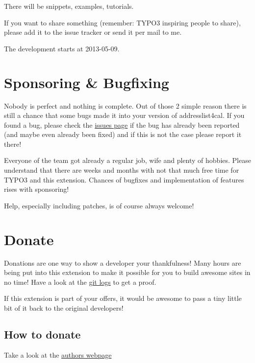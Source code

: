 \documentclass[a4paper,10pt,english]{sphinxtypo3manual}
\begin{document}
There will be snippets, examples, tutorials.

If you want to share something (remember: TYPO3 inspiring people to
share), please add it to the issue tracker or send it per mail to me.

The development starts at 2013-05-09.


\section{Sponsoring \& Bugfixing}
\label{index:sponsoring-bugfixing}
Nobody is perfect and nothing is complete. Out of those 2 simple
reason there is still a chance that some bugs made it into your
version of addresslist4cal. If you found a bug, please check the \href{http://forge.typo3.org/projects/extension-addresslist4cal/issues}{issues page}
if the bug has already been reported (and maybe even already been fixed) and if
this is not the case please report it there!

Everyone of the team got already a regular job, wife and plenty of
hobbies. Please understand that there are weeks and months with not
that much free time for TYPO3 and this extension. Chances of bugfixes
and implementation of features rises with sponsoring!

Help, especially including patches, is of course always welcome!


\section{Donate}
\label{index:donate}
Donations are one way to show a developer your thankfulness!
Many hours are being put into this extension to make it possible
for you to build awesome sites in no time!
Have a look at the \href{http://git.typo3.org/TYPO3v4/Extensions/addresslist4cal.git?a=shortlog}{git logs}  to get a proof.

If this extension is part of your offers, it would be awesome to pass
a tiny little bit of it back to the original developers!


\subsection{How to donate}
\label{index:how-to-donate}
Take a look at the \href{http://www.oehlhof.de/T3/typo3-cms.html}{authors webpage}
\end{document}
